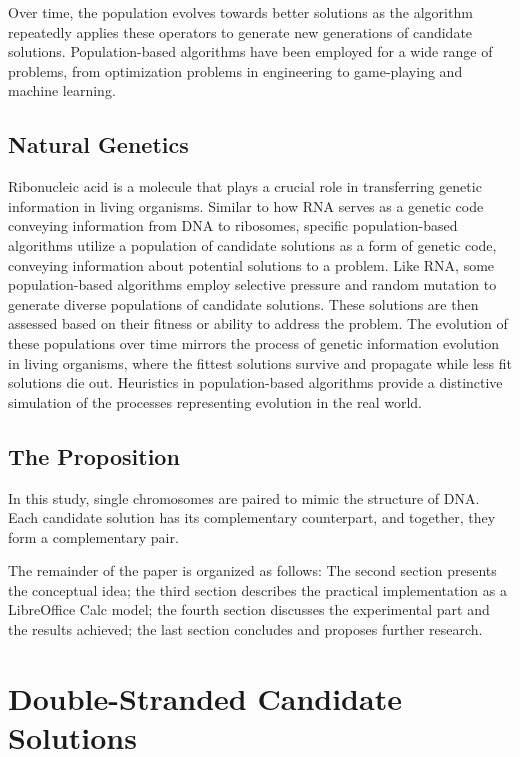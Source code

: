 \documentclass[runningheads]{llncs}
\begin{document}
Over time, the population evolves towards better solutions as the algorithm repeatedly applies these operators to generate new generations of candidate solutions. Population-based algorithms have been employed for a wide range of problems, from optimization problems in engineering to game-playing and machine learning.

\subsection{Natural Genetics}

Ribonucleic acid is a molecule that plays a crucial role in transferring genetic information in living organisms. Similar to how RNA serves as a genetic code conveying information from DNA to ribosomes, specific population-based algorithms utilize a population of candidate solutions as a form of genetic code, conveying information about potential solutions to a problem. Like RNA, some population-based algorithms employ selective pressure and random mutation to generate diverse populations of candidate solutions. These solutions are then assessed based on their fitness or ability to address the problem. The evolution of these populations over time mirrors the process of genetic information evolution in living organisms, where the fittest solutions survive and propagate while less fit solutions die out. Heuristics in population-based algorithms provide a distinctive simulation of the processes representing evolution in the real world.

\subsection*{The Proposition}

In this study, single chromosomes are paired to mimic the structure of DNA. Each candidate solution has its complementary counterpart, and together, they form a complementary pair.

The remainder of the paper is organized as follows: The second section presents the conceptual idea; the third section describes the practical implementation as a LibreOffice Calc model; the fourth section discusses the experimental part and the results achieved; the last section concludes and proposes further research.

\section{Double-Stranded Candidate Solutions}
\end{document}
